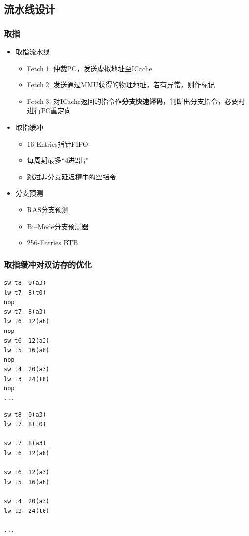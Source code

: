\documentclass{beamer}
\begin{document}
\subsection{流水线设计}

\begin{frame}
    \frametitle{取指}
    \begin{itemize}
        \item 取指流水线\begin{itemize}
            \item Fetch 1: 仲裁PC，发送虚拟地址至ICache
            \item Fetch 2: 发送通过MMU获得的物理地址，若有异常，则作标记
            \item Fetch 3: 对ICache返回的指令作\textbf{分支快速译码}，判断出分支指令，必要时进行PC重定向
        \end{itemize}
        \item 取指缓冲\begin{itemize}
            \item 16-Entries指针FIFO
            \item 每周期最多“4进2出”
            \item 跳过非分支延迟槽中的空指令
        \end{itemize}
        \item 分支预测\begin{itemize}
            \item RAS分支预测
            \item Bi--Mode分支预测器
            \item 256-Entries BTB
        \end{itemize}
    \end{itemize}
\end{frame}

\begin{frame}[fragile]
    \frametitle{取指缓冲对双访存的优化}
\begin{minipage}[c]{0.4\linewidth}
\begin{lstlisting}
sw t8, 0(a3)
lw t7, 8(t0)
nop
sw t7, 8(a3)
lw t6, 12(a0)
nop
sw t6, 12(a3)
lw t5, 16(a0)
nop
sw t4, 20(a3)
lw t3, 24(t0)
nop
...
\end{lstlisting}
    \end{minipage}\hfill
\begin{minipage}{0.4\linewidth}
\begin{lstlisting}
sw t8, 0(a3)
lw t7, 8(t0)

sw t7, 8(a3)
lw t6, 12(a0)

sw t6, 12(a3)
lw t5, 16(a0)

sw t4, 20(a3)
lw t3, 24(t0)

...
\end{lstlisting}
    
\end{minipage}
\end{frame}
\end{document}
